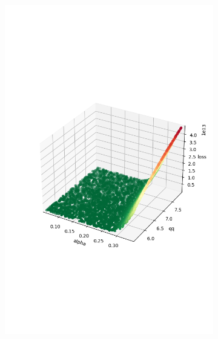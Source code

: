 \begin{figure}
	\centering
	\begin{subfigure}[b]{0.4\textwidth}
		\centering
		\includegraphics[width=\textwidth]{./figures/sensitivity/sensitivity_zoom0_0.png}	
	\end{subfigure}
	\begin{subfigure}[b]{0.4\textwidth}
		\centering

\end{subfigure}
\end{figure}
